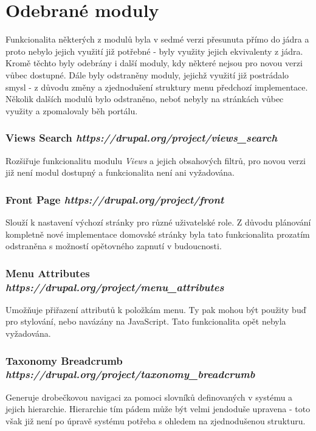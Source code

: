 \section{Odebrané moduly}
Funkcionalita některých z modulů byla v sedmé verzi přesunuta přímo do jádra a proto nebylo jejich využití již potřebné - byly využity jejich ekvivalenty z jádra. Kromě těchto byly odebrány i další moduly, kdy některé nejsou pro novou verzi vůbec dostupné. Dále byly odstraněny moduly, jejichž využití již postrádalo smysl - z důvodu změny a zjednodušení struktury menu předchozí implementace. Několik dalších modulů bylo odstraněno, neboť nebyly na stránkách vůbec využity a zpomalovaly běh portálu. 

\subsubsection*{\textbf{Views Search} \hfill \emph{https://drupal.org/project/views\_search}}
Rozšiřuje funkcionalitu modulu \emph{Views} a jejich obsahových filtrů, pro novou verzi již není modul dostupný a funkcionalita není ani vyžadována.

\subsubsection*{\textbf{Front Page} \hfill \emph{https://drupal.org/project/front}}
Slouží k nastavení výchozí stránky pro různé uživatelské role. Z důvodu plánování kompletně nové implementace domovské stránky byla tato funkcionalita prozatím odstraněna s možností opětovného zapnutí v budoucnosti.

\subsubsection*{\textbf{Menu Attributes} \hfill \emph{https://drupal.org/project/menu\_attributes}}
Umožňuje přiřazení attributů k položkám menu. Ty pak mohou být použity buď pro stylování, nebo navázány na JavaScript. Tato funkcionalita opět nebyla vyžadována.

\subsubsection*{\textbf{Taxonomy Breadcrumb} \hfill \emph{https://drupal.org/project/taxonomy\_breadcrumb}}
Generuje drobečkovou navigaci za pomoci slovníků definovaných v systému a jejich hierarchie. Hierarchie tím pádem může být velmi jendoduše upravena - toto však již není po úpravě systému potřeba s ohledem na zjednodušenou strukturu.

